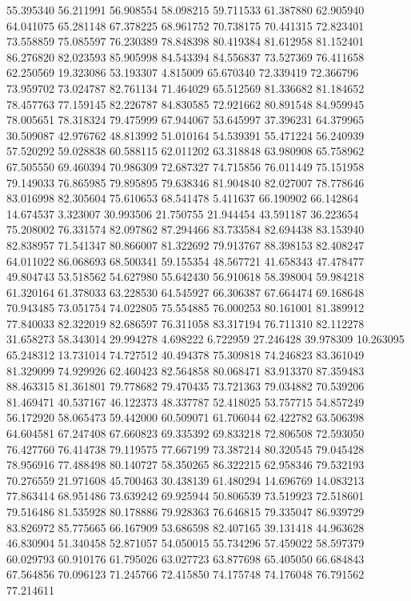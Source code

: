 55.395340
56.211991
56.908554
58.098215
59.711533
61.387880
62.905940
64.041075
65.281148
67.378225
68.961752
70.738175
70.441315
72.823401
73.558859
75.085597
76.230389
78.848398
80.419384
81.612958
81.152401
86.276820
82.023593
85.905998
84.543394
84.556837
73.527369
76.411658
62.250569
19.323086
53.193307
4.815009
65.670340
72.339419
72.366796
73.959702
73.024787
82.761134
71.464029
65.512569
81.336682
81.184652
78.457763
77.159145
82.226787
84.830585
72.921662
80.891548
84.959945
78.005651
78.318324
79.475999
67.944067
53.645997
37.396231
64.379965
30.509087
42.976762
48.813992
51.010164
54.539391
55.471224
56.240939
57.520292
59.028838
60.588115
62.011202
63.318848
63.980908
65.758962
67.505550
69.460394
70.986309
72.687327
74.715856
76.011449
75.151958
79.149033
76.865985
79.895895
79.638346
81.904840
82.027007
78.778646
83.016998
82.305604
75.610653
68.541478
5.411637
66.190902
66.142864
14.674537
3.323007
30.993506
21.750755
21.944454
43.591187
36.223654
75.208002
76.331574
82.097862
87.294466
83.733584
82.694438
83.153940
82.838957
71.541347
80.866007
81.322692
79.913767
88.398153
82.408247
64.011022
86.068693
68.500341
59.155354
48.567721
41.658343
47.478477
49.804743
53.518562
54.627980
55.642430
56.910618
58.398004
59.984218
61.320164
61.378033
63.228530
64.545927
66.306387
67.664474
69.168648
70.943485
73.051754
74.022805
75.554885
76.000253
80.161001
81.389912
77.840033
82.322019
82.686597
76.311058
83.317194
76.711310
82.112278
31.658273
58.343014
29.994278
4.698222
6.722959
27.246428
39.978309
10.263095
65.248312
13.731014
74.727512
40.494378
75.309818
74.246823
83.361049
81.329099
74.929926
62.460423
82.564858
80.068471
83.913370
87.359483
88.463315
81.361801
79.778682
79.470435
73.721363
79.034882
70.539206
81.469471
40.537167
46.122373
48.337787
52.418025
53.757715
54.857249
56.172920
58.065473
59.442000
60.509071
61.706044
62.422782
63.506398
64.604581
67.247408
67.660823
69.335392
69.833218
72.806508
72.593050
76.427760
76.414738
79.119575
77.667199
73.387214
80.320545
79.045428
78.956916
77.488498
80.140727
58.350265
86.322215
62.958346
79.532193
70.276559
21.971608
45.700463
30.438139
61.480294
14.696769
14.083213
77.863414
68.951486
73.639242
69.925944
50.806539
73.519923
72.518601
79.516486
81.535928
80.178886
79.928363
76.646815
79.335047
86.939729
83.826972
85.775665
66.167909
53.686598
82.407165
39.131418
44.963628
46.830904
51.340458
52.871057
54.050015
55.734296
57.459022
58.597379
60.029793
60.910176
61.795026
63.027723
63.877698
65.405050
66.684843
67.564856
70.096123
71.245766
72.415850
74.175748
74.176048
76.791562
77.214611
